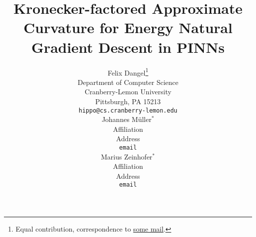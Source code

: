 \newcommand{\papertitle}{%
  Kronecker-factored Approximate Curvature for Energy Natural Gradient Descent in PINNs
}
\title{\papertitle}

%

\author{%
  Felix Dangel\thanks{Equal contribution, correspondence to \url{some mail}.}\\
  Department of Computer Science\\
  Cranberry-Lemon University\\
  Pittsburgh, PA 15213 \\
  \texttt{hippo@cs.cranberry-lemon.edu} \\
  \And
  Johannes M\"uller$^*$\\
  Affiliation \\
  Address \\
  \texttt{email} \\
  \And
  Marius Zeinhofer$^*$\\
  Affiliation \\
  Address \\
  \texttt{email} \\
}
